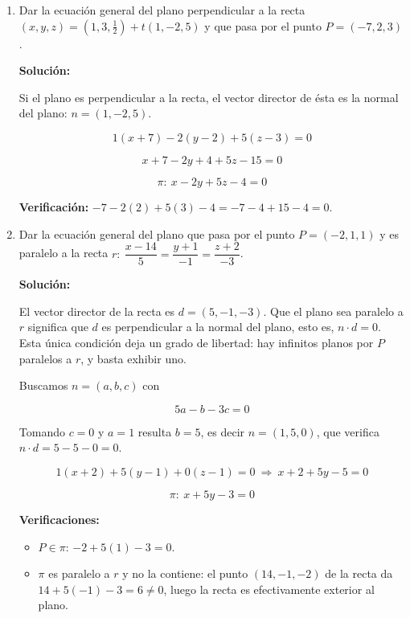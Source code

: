 \documentclass[12pt]{article}
\newcommand{\solucion}{%
    \vspace{0.8em}%
    \textbf{Solución:}%
    \vspace{0.8em}%
}
\begin{document}
\begin{enumerate}[label=\alph*.-]
    (El plano no contiene a la variable $z$: es un plano paralelo al eje $z$.)

    \item Dar la ecuación general del plano perpendicular a la recta
    $(x,y,z)=\left(1,3,\tfrac{1}{2}\right)+t(1,-2,5)$ y que pasa por el punto
    $P=(-7,2,3)$.

    \solucion

    Si el plano es perpendicular a la recta, el vector director de ésta es
    la normal del plano: $n=(1,-2,5)$.

    \[
    1(x+7)-2(y-2)+5(z-3)=0
    \]

    \[
    x+7-2y+4+5z-15=0
    \]

    \[
    \boxed{\pi:\ x-2y+5z-4=0}
    \]

    \textbf{Verificación:} $-7-2(2)+5(3)-4=-7-4+15-4=0$. \checkmark

    \item Dar la ecuación general del plano que pasa por el punto
    $P=(-2,1,1)$ y es paralelo a la recta
    $r:\ \dfrac{x-14}{5}=\dfrac{y+1}{-1}=\dfrac{z+2}{-3}$.

    \solucion

    El vector director de la recta es $d=(5,-1,-3)$. Que el plano sea
    paralelo a $r$ significa que $d$ es perpendicular a la normal del plano,
    esto es, $n\cdot d=0$. Esta única condición deja un grado de libertad:
    hay infinitos planos por $P$ paralelos a $r$, y basta exhibir uno.

    Buscamos $n=(a,b,c)$ con

    \[
    5a-b-3c=0
    \]

    Tomando $c=0$ y $a=1$ resulta $b=5$, es decir $n=(1,5,0)$, que verifica
    $n\cdot d=5-5-0=0$. \checkmark

    \[
    1(x+2)+5(y-1)+0(z-1)=0\ \Longrightarrow\ x+2+5y-5=0
    \]

    \[
    \boxed{\pi:\ x+5y-3=0}
    \]

    \textbf{Verificaciones:}

    \begin{itemize}
        \item $P\in\pi$: $-2+5(1)-3=0$. \checkmark
        \item $\pi$ es paralelo a $r$ y no la contiene: el punto
        $(14,-1,-2)$ de la recta da $14+5(-1)-3=6\neq0$, luego la recta es
        efectivamente exterior al plano. \checkmark
    \end{itemize}

\end{enumerate}
\end{document}
